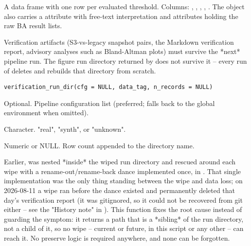 \documentclass[a4paper]{book}
\begin{document}
%
\begin{Value}
A data frame with one row per evaluated threshold. Columns:
, , ,
, . The object also carries a
 attribute with free-text interpretation and
 attributes holding the raw BA result lists.
\end{Value}
%
\begin{Description}
Verification artifacts (S3-vs-legacy snapshot  pairs, the
Markdown verification report, advisory analyses such as Bland-Altman
plots) must survive the *next* pipeline run. The figure run directory
returned by  does not survive it -- every run
of  deletes and rebuilds that directory from
scratch.
\end{Description}
%
\begin{Usage}
\begin{verbatim}
verification_run_dir(cfg = NULL, data_tag, n_records = NULL)
\end{verbatim}
\end{Usage}
%
\begin{Arguments}
\begin{ldescription}
\item[\code{cfg}] Optional. Pipeline configuration list (preferred; falls back to
the global environment when omitted).

\item[\code{data\_tag}] Character. "real", "synth", or "unknown".

\item[\code{n\_records}] Numeric or NULL. Row count appended to the directory name.
\end{ldescription}
\end{Arguments}
%
\begin{Details}
Earlier,  was nested *inside* the wiped run directory
and rescued around each wipe with a rename-out/rename-back dance
implemented once, in . That single
implementation was the only thing standing between the wipe and data loss;
on 2026-08-11 a wipe ran before the dance existed and permanently deleted
that day's verification report (it was gitignored, so it could not be
recovered from git either -- see the "History note" in
). This
function fixes the root cause instead of guarding the symptom: it returns
a path that is a *sibling* of the run directory, not a child of it, so no
wipe -- current or future, in this script or any other -- can reach it.
No preserve logic is required anywhere, and none can be forgotten.
\end{Details}
\end{document}
